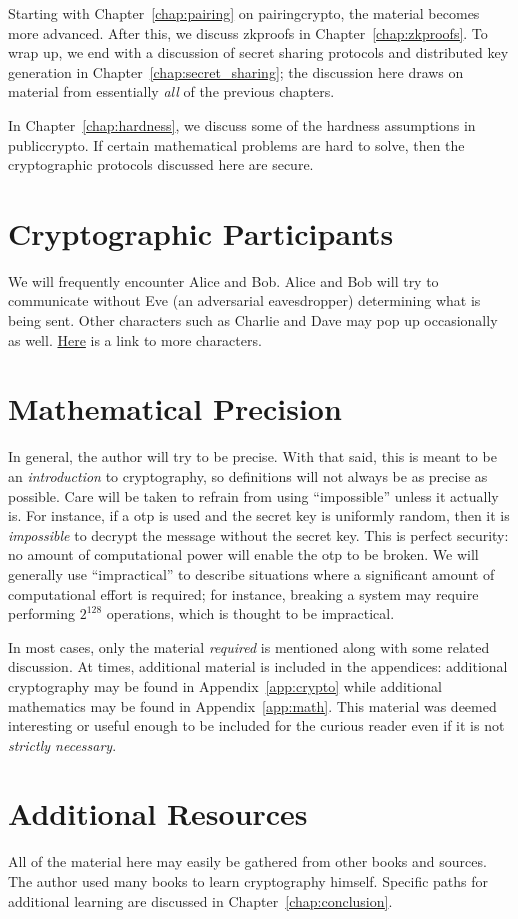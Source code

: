 Starting with Chapter~\ref{chap:pairing} on \gls{pairingcrypto},
the material becomes more advanced.
After this, we discuss \glspl{zkproof} in Chapter~\ref{chap:zkproofs}.
To wrap up, we end with a discussion of secret sharing protocols
and \gls{distributed key generation} in Chapter~\ref{chap:secret_sharing};
the discussion here draws on material from essentially \emph{all}
of the previous chapters.

In Chapter~\ref{chap:hardness}, we discuss some of the hardness assumptions
in \gls{publiccrypto}.
If certain mathematical problems are hard to solve,
then the cryptographic protocols discussed here are secure.



\section{Cryptographic Participants}

We will frequently encounter Alice and Bob.
Alice and Bob will try to communicate without Eve
(an adversarial eavesdropper) determining what is being sent.
Other characters such as Charlie and Dave may pop up occasionally as well.
\href{https://en.wikipedia.org/wiki/Alice_and_Bob}{Here}
is a link to more characters.



\section{Mathematical Precision}

In general, the author will try to be precise.
With that said, this is meant to be an \emph{introduction} to cryptography,
so definitions will not always be as precise as possible.
Care will be taken to refrain from using ``impossible''
unless it actually is.
For instance, if a \gls{otp} is used and the secret key is
uniformly random, then it is \emph{impossible} to decrypt the message
without the secret key.
This is \gls{perfect security}: no amount of computational power will enable
the \gls{otp} to be broken.
We will generally use ``impractical'' to describe situations
where a significant amount of computational effort is required;
for instance, breaking a system may require performing $2^{128}$
operations, which is thought to be impractical.

In most cases, only the material \emph{required} is mentioned
along with some related discussion.
At times, additional material is included in the appendices:
additional cryptography may be found in Appendix~\ref{app:crypto}
while additional mathematics may be found in Appendix~\ref{app:math}.
This material was deemed interesting or useful enough
to be included for the curious reader even if it is not
\emph{strictly necessary}.



\section{Additional Resources}

All of the material here may easily be gathered from other books and sources.
The author used many books to learn cryptography himself.
Specific paths for additional learning are discussed
in Chapter~\ref{chap:conclusion}.
